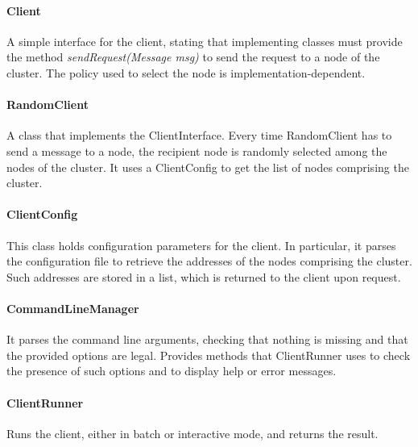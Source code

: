 \documentclass{article}
\begin{document}
\paragraph{Client} A simple interface for the client, stating that implementing classes must provide the method \textit{sendRequest(Message msg)} to send the request to a node of the cluster. The policy used to select the node is implementation-dependent.
\paragraph{RandomClient} A class that implements the ClientInterface. Every time RandomClient has to send a message to a node, the recipient node is randomly selected among the nodes of the cluster. It uses a ClientConfig to get the list of nodes comprising the cluster.
\paragraph{ClientConfig} This class holds configuration parameters for the client. In particular, it parses the configuration file to retrieve the addresses of the nodes comprising the cluster. Such addresses are stored in a list, which is returned to the client upon request.
\paragraph{CommandLineManager} It parses the command line arguments, checking that nothing is missing and that the provided options are legal. Provides methods that ClientRunner uses to check the presence of such options and to display help or error messages.
\paragraph{ClientRunner} Runs the client, either in batch or interactive mode, and returns the result. 
\end{document}
